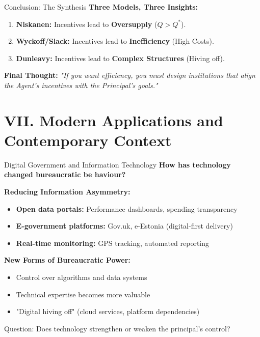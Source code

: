 \documentclass[10pt]{beamer}
\begin{document}
\begin{frame}{Conclusion: The Synthesis}
\textbf{Three Models, Three Insights:}
\begin{enumerate}
\item \textbf{Niskanen:} Incentives lead to \textbf{Oversupply} ($Q > Q^*$).
\item \textbf{Wyckoff/Slack:} Incentives lead to \textbf{Inefficiency} (High Costs).
\item \textbf{Dunleavy:} Incentives lead to \textbf{Complex Structures} (Hiving off).
\end{enumerate}

\textbf{Final Thought:}
\textit{"If you want efficiency, you must design institutions that align the Agent's incentives with the Principal's goals."}
\end{frame}


\section{VII. Modern Applications and Contemporary Context}

\begin{frame}{Digital Government and Information Technology}
\textbf{How has technology changed bureaucratic be haviour?}


\textbf{Reducing Information Asymmetry:}
\begin{itemize}
\item \textbf{Open data portals:} Performance dashboards, spending transparency
\item \textbf{E-government platforms:} Gov.uk, e-Estonia (digital-first delivery)
\item \textbf{Real-time monitoring:} GPS tracking, automated reporting
\end{itemize}


\textbf{New Forms of Bureaucratic Power:}
\begin{itemize}
\item Control over algorithms and data systems
\item Technical expertise becomes more valuable
\item "Digital hiving off" (cloud services, platform dependencies)
\end{itemize}


\alert{Question:} Does technology strengthen or weaken the principal's control?
\end{frame}
\end{document}
